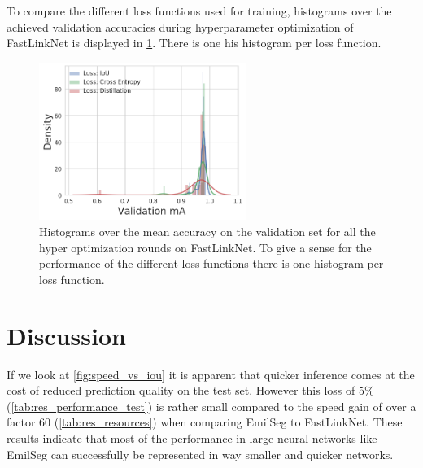 \documentclass{kththesis}
\begin{document}
To compare the different loss functions used for training, histograms over the achieved
validation accuracies during hyperparameter optimization of FastLinkNet is
displayed in \cref{fig:loss_fn}. There is one his histogram per loss function.

\begin{figure}[h]
  \centering
  \includegraphics[width=0.6\textwidth]{Loss_fn_hist_FastLinkNet3}
  \caption{Histograms over the mean accuracy on the validation set for all the
    hyper optimization rounds on FastLinkNet. To give a sense for the
    performance of the different loss functions there is one histogram per loss
    function.}
  \label{fig:loss_fn}
\end{figure}

\chapter{Discussion}
If we look at \cref{fig:speed_vs_iou} it is apparent that quicker inference comes
at the cost of reduced prediction quality on the test set. However this loss of
\(5 \%\) (\cref{tab:res_performance_test}) is rather small
compared to the speed gain of over a factor \(60\) (\cref{tab:res_resources}) when comparing EmilSeg to
FastLinkNet. These results indicate that most of the performance in large neural
networks like EmilSeg can successfully be represented in way smaller and quicker
networks.
\end{document}
